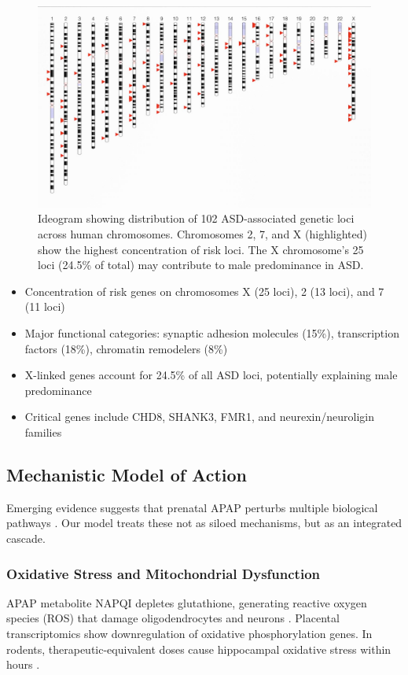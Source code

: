 \documentclass[12pt]{article}
\begin{document}
\begin{figure}[h]
\centering
\includegraphics[width=\textwidth]{../assets/Autism-Ideogram.jpg}
\caption{Ideogram showing distribution of 102 ASD-associated genetic loci across human chromosomes. Chromosomes 2, 7, and X (highlighted) show the highest concentration of risk loci. The X chromosome's 25 loci (24.5\% of total) may contribute to male predominance in ASD.}
\label{fig:ideogram}
\end{figure}

\begin{itemize}
\item Concentration of risk genes on chromosomes X (25 loci), 2 (13 loci), and 7 (11 loci)
\item Major functional categories: synaptic adhesion molecules (15\%), transcription factors (18\%), chromatin remodelers (8\%)
\item X-linked genes account for 24.5\% of all ASD loci, potentially explaining male predominance
\item Critical genes include CHD8, SHANK3, FMR1, and neurexin/neuroligin families
\end{itemize}

\subsection{Mechanistic Model of Action}
Emerging evidence suggests that prenatal APAP perturbs multiple biological pathways \citep{baker2020,kristensen2016,zhu2021}. Our model treats these not as siloed mechanisms, but as an integrated cascade.

\subsubsection{Oxidative Stress and Mitochondrial Dysfunction}
APAP metabolite NAPQI depletes glutathione, generating reactive oxygen species (ROS) that damage oligodendrocytes and neurons \citep{parker2020,posadas2019}. Placental transcriptomics show downregulation of oxidative phosphorylation genes. In rodents, therapeutic-equivalent doses cause hippocampal oxidative stress within hours \citep{philippot2022,riffel2020}.
\end{document}
